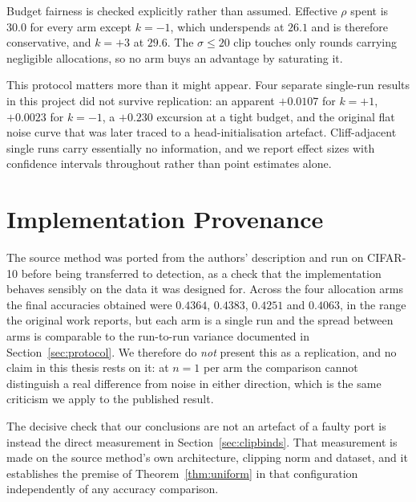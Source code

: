 \vspace{10pt}

Budget fairness is checked explicitly rather than assumed. Effective $\rho$
spent is $30.0$ for every arm except $k=-1$, which underspends at $26.1$ and is
therefore conservative, and $k=+3$ at $29.6$. The $\sigma\le20$ clip touches only
rounds carrying negligible allocations, so no arm buys an advantage by
saturating it.

\vspace{10pt}

This protocol matters more than it might appear. Four separate single-run
results in this project did not survive replication: an apparent $+0.0107$ for
$k=+1$, $+0.0023$ for $k=-1$, a $+0.230$ excursion at a tight budget, and the
original flat noise curve that was later traced to a head-initialisation
artefact. Cliff-adjacent single runs carry essentially no information, and we
report effect sizes with confidence intervals throughout rather than point
estimates alone.

\section{Implementation Provenance}
\label{sec:provenance}

The source method was ported from the authors' description and run on CIFAR-10
before being transferred to detection, as a check that the implementation
behaves sensibly on the data it was designed for. Across the four allocation
arms the final accuracies obtained were $0.4364$, $0.4383$, $0.4251$ and
$0.4063$, in the range the original work reports, but each arm is a single run
and the spread between arms is comparable to the run-to-run variance documented
in Section~\ref{sec:protocol}. We therefore do \emph{not} present this as a
replication, and no claim in this thesis rests on it: at $n=1$ per arm the
comparison cannot distinguish a real difference from noise in either direction,
which is the same criticism we apply to the published result.

\vspace{10pt}

The decisive check that our conclusions are not an artefact of a faulty port is
instead the direct measurement in Section~\ref{sec:clipbinds}. That measurement
is made on the source method's own architecture, clipping norm and dataset, and
it establishes the premise of Theorem~\ref{thm:uniform} in that configuration
independently of any accuracy comparison.
